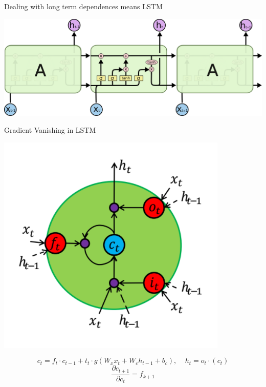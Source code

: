 \documentclass{beamer}
\begin{document}
\begin{frame}{Dealing with long term dependences means LSTM}
	\begin{center}
		 \includegraphics[scale=0.4]{./img/lstm_full}
	\end{center}
\end{frame}

\begin{frame}{Gradient Vanishing in LSTM}
	\begin{center}
		 \includegraphics[scale=0.4]{./img/lstm}
	\end{center}
 	$$c_t = f_t\cdot c_{t-1} + t_t\cdot g(W_xx_t+W_ch_{t-1}+b_c),~~~~~h_t = o_t\cdot(c_t)$$
 	$$\frac{\partial c_{t+1} }{\partial c_t} = f_{k+1}$$
\end{frame}
\end{document}
